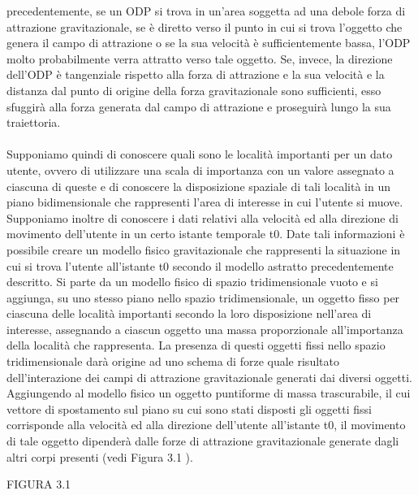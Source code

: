 precedentemente, se un ODP si trova in un'area soggetta ad una debole
forza di attrazione gravitazionale, se \`e diretto verso il punto in cui si trova
l'oggetto che genera il campo di attrazione o se la sua velocit\`a \`e sufficientemente
bassa, l'ODP molto probabilmente verra attratto verso tale oggetto.
Se, invece, la direzione dell'ODP \`e tangenziale rispetto alla forza di attrazione
e la sua velocit\`a e la distanza dal punto di origine della forza gravitazionale
sono sufficienti, esso sfuggir\`a alla forza generata dal campo di attrazione e
proseguir\`a lungo la sua traiettoria.\\
\\
Supponiamo quindi di conoscere quali sono le localit\`a importanti per un
dato utente, ovvero di utilizzare una scala di importanza con un valore assegnato
a ciascuna di queste e di conoscere la disposizione spaziale di tali localit\`a
in un piano bidimensionale che rappresenti l'area di interesse in cui l'utente
si muove. Supponiamo inoltre di conoscere i dati relativi alla velocit\`a ed alla
direzione di movimento dell'utente in un certo istante temporale t0. Date tali
informazioni \`e possibile creare un modello fisico gravitazionale che rappresenti
la situazione in cui si trova l'utente all'istante t0 secondo il modello astratto
precedentemente descritto.
Si parte da un modello fisico di spazio tridimensionale vuoto e si aggiunga,
su uno stesso piano nello spazio tridimensionale, un oggetto fisso per ciascuna
delle localit\`a importanti secondo la loro disposizione nell'area di interesse,
assegnando a ciascun oggetto una massa proporzionale all'importanza della
localit\`a che rappresenta. La presenza di questi oggetti fissi nello spazio tridimensionale
dar\`a origine ad uno schema di forze quale risultato dell'interazione
dei campi di attrazione gravitazionale generati dai diversi oggetti. Aggiungendo
al modello fisico un oggetto puntiforme di massa trascurabile, il cui vettore
di spostamento sul piano su cui sono stati disposti gli oggetti fissi corrisponde
alla velocit\`a ed alla direzione dell'utente all'istante t0, il movimento di tale
oggetto dipender\`a dalle forze di attrazione gravitazionale generate dagli altri
corpi presenti (vedi Figura 3.1 ).

FIGURA 3.1

